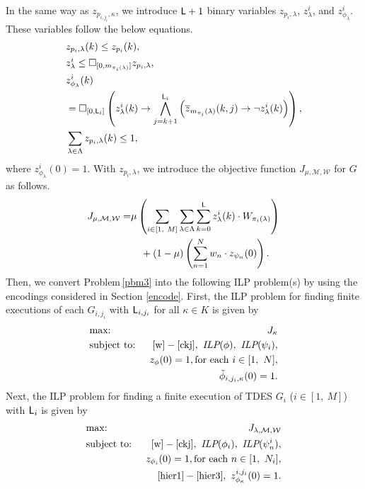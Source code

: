 \documentclass[journal,twoside,web]{IEEEtran}
\newcommand{\req}[1]{\eqref{#1}}
\newcommand{\rpbm}[1]{Problem\,\ref{#1}}
\newcommand{\Len}{{\sf L}}
\newcommand{\M}{\mathcal{M}}
\newcommand{\W}{\mathcal{W}}
\newcommand{\G}[1]{\Box_{[#1]}}
\begin{document}
In the same way as $z_{p_{i,{j_i}},\kappa}$, we introduce  $\Len + 1$ binary variables $z_{p_{i},\lambda}$, $z_\lambda^i$, and $z^{i}_{\phi_\lambda} $.
These variables follow the below equations.
\begin{align}
&{z}_{p_{i},\lambda}(k) \leq z_{p_{i}}(k), \label{hier2-1}\\
%
&{z}^{i}_\lambda
\leq\G{0,m_{\pi_{i}(\lambda)}} z_{p_{i},\lambda},\label{hier2-2}\\
%
&z^{i}_{\phi_\lambda} (k)
\notag \\
&=\G{0,\Len_i}
\left(
{z}_\lambda^{i} (k)\to
\bigwedge_{j=k+1}^{\Len_i}
\left(
\overline{z}_{m_{\pi_{i}}(\lambda)}
(k,j)\to \lnot {z}^{i}_\lambda (k)
\right)
\right),\label{hier2-3}\\
%
&\sum_{\lambda\in\Lambda}{z}_{p_{i},\lambda}(k) \leq 1,\label{hier2-4}
\end{align}
where $z^{i}_{\phi_\lambda} (0)=1$.
%
With $z_{p_{i},\lambda}$, we introduce the objective function  $J_{\mu,\M,\W}$ for $G$ as follows.
\begin{align}
J_{\mu,\M,\W}=&
\mu\left(\sum_{i\in[1,~M]} \sum_{\lambda\in\Lambda} \sum_{k=0}^{\Len} {z}^i_\lambda
(k) \cdot W_{\pi_i(\lambda)}\right)
\notag\\
&~~~+
(1-\mu)\left(\sum_{n=1}^{N} w_{n}\cdot z_{\psi_{n}}(0)\right).\label{obj}\notag
\end{align}
%
Then, we convert \rpbm{pbm3} into the following ILP problem(s) by using the encodings considered in Section \ref{encode}. 
First, the ILP problem for finding finite executions of each $G_{i,j_i}$ with $\Len_{i,j_i}$ for all $\kappa\in K$ is given by
%
\begin{eqnarray}
&\mbox{max: }&J_\kappa \notag \\
&\mbox{subject to: }&\req{w}-\req{ckj},\ \textit{ILP}(\phi),\ \textit{ILP}(\psi_i),\notag\\
&&z_{\phi} (0) = 1, {\rm{for\ each\ }}  i \in [1,\ N],\notag\\ &&\tilde{\phi}_{i,{j_i},\kappa}(0)=1.\notag
\end{eqnarray}
%
Next, the ILP problem for finding a finite execution of  TDES $G_i$ ($i\in[1,~M]$) with $\Len_i$ is given by
\begin{eqnarray}
&\mbox{max: }&
J_{\lambda,\M,\W}\notag\\
&\mbox{subject to: }&\req{w}-\req{ckj},\ \textit{ILP}(\phi_i),\ \textit{ILP}(\psi^i_n),\notag\\
&&z_{\phi_i} (0) = 1, {\rm{for\ each\ }}  n \in [1,\ N_i],\notag\\&&\req{hier1}-\req{hier3},~ z^{i,{j_i}}_{\phi_\kappa}(0)=1 .\notag
\end{eqnarray}
\end{document}
